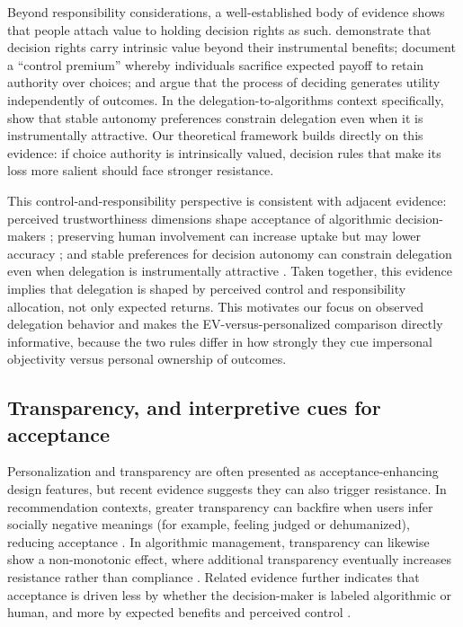 \documentclass[a4paper, 12pt, fleqn]{article}
\theoremstyle{definition}
\newcommand{\inew}[1]{{\color{blue} #1\color{black}}}
\begin{document}
\inew{Beyond responsibility considerations, a well-established body of evidence shows that people attach value to holding decision rights as such. \citet{Bartling2014} demonstrate that decision rights carry intrinsic value beyond their instrumental benefits; \citet{Owens2014} document a ``control premium'' whereby individuals sacrifice expected payoff to retain authority over choices; and \citet{FreyBenzStutzer2004} argue that the process of deciding generates utility independently of outcomes. In the delegation-to-algorithms context specifically, \citet{Ivanova-Stenzel2025} show that stable autonomy preferences constrain delegation even when it is instrumentally attractive. Our theoretical framework builds directly on this evidence: if choice authority is intrinsically valued, decision rules that make its loss more salient should face stronger resistance.}

This control-and-responsibility perspective is consistent with adjacent evidence: perceived trustworthiness dimensions shape acceptance of algorithmic decision-makers \citep{Hoeddinghaus2021}; preserving human involvement can increase uptake but may lower accuracy \citep{Sele2024}; and stable preferences for decision autonomy can constrain delegation even when delegation is instrumentally attractive \citep{Ivanova-Stenzel2025}. Taken together, this evidence implies that delegation is shaped by perceived control and responsibility allocation, not only expected returns. This motivates our focus on observed delegation behavior and makes the EV-versus-personalized comparison directly informative, because the two rules differ in how strongly they cue impersonal objectivity versus personal ownership of outcomes.

\subsection{Transparency, and interpretive cues for acceptance}
Personalization and transparency are often presented as acceptance-enhancing design features, but recent evidence suggests they can also trigger resistance. In recommendation contexts, greater transparency can backfire when users infer socially negative meanings (for example, feeling judged or dehumanized), reducing acceptance \citep{Chen2024}. In algorithmic management, transparency can likewise show a non-monotonic effect, where additional transparency eventually increases resistance rather than compliance \citep{Hu2024}. Related evidence further indicates that acceptance is driven less by whether the decision-maker is labeled algorithmic or human, and more by expected benefits and perceived control \citep{Schaap2024}.
\end{document}
